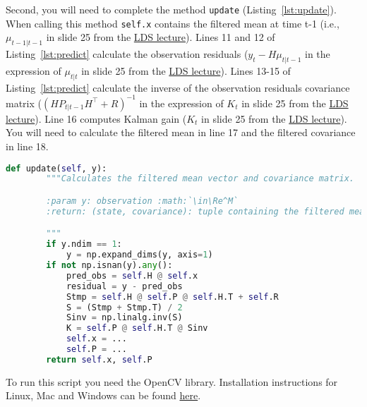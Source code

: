 \documentclass[12pt]{article}
\begin{document}
Second, you will need to complete the method \texttt{update}
(Listing~\ref{lst:update}). When calling this method \texttt{self.x} contains
the filtered mean at time t-1 (i.e., $\mu_{t-1|t-1}$ in slide 25 from the
\href{https://github.com/joacorapela/neuroinformatics24/blob/master/lectures/07_linearDynamicalSystems/LDS_SWCNeuroinf2024.pdf}{LDS
lecture}).
%
Lines 11 and 12 of Listing~\ref{lst:predict} calculate the observation
residuals ($y_t-H\mu_{t|t-1}$ in the expression of $\mu_{t|t}$ in slide 25 from
the
\href{https://github.com/joacorapela/neuroinformatics24/blob/master/lectures/07_linearDynamicalSystems/LDS_SWCNeuroinf2024.pdf}{LDS
lecture}).
%
Lines 13-15 of Listing~\ref{lst:predict} calculate the inverse of the
observation residuals covariance matrix ($(HP_{t|t-1}H^\intercal+R)^{-1}$ in
the expression of $K_t$ in slide 25 from the
\href{https://github.com/joacorapela/neuroinformatics24/blob/master/lectures/07_linearDynamicalSystems/LDS_SWCNeuroinf2024.pdf}{LDS
lecture}).
%
Line 16 computes Kalman gain ($K_t$ in slide 25 from the
\href{https://github.com/joacorapela/neuroinformatics24/blob/master/lectures/07_linearDynamicalSystems/LDS_SWCNeuroinf2024.pdf}{LDS
lecture}).
%
You will need to calculate the filtered mean in line 17 and the filtered
covariance in line 18.

\begin{lstlisting}[caption={method \texttt{update} in class \texttt{OnlineKalmanFilter} in module \texttt{inference.py}},label={lst:update},language=python]
    def update(self, y):
        """Calculates the filtered mean vector and covariance matrix.

        :param y: observation :math:`\in\Re^M`
        :return: (state, covariance): tuple containing the filtered mean vector and covariance matrix.

        """
        if y.ndim == 1:
            y = np.expand_dims(y, axis=1)
        if not np.isnan(y).any():
            pred_obs = self.H @ self.x
            residual = y - pred_obs
            Stmp = self.H @ self.P @ self.H.T + self.R
            S = (Stmp + Stmp.T) / 2
            Sinv = np.linalg.inv(S)
            K = self.P @ self.H.T @ Sinv
            self.x = ...
            self.P = ...
        return self.x, self.P

\end{lstlisting}

To run this script you need the OpenCV library. Installation instructions for
Linux, Mac and Windows can be found
\href{https://opencv.org/get-started/}{here}.
\end{document}
